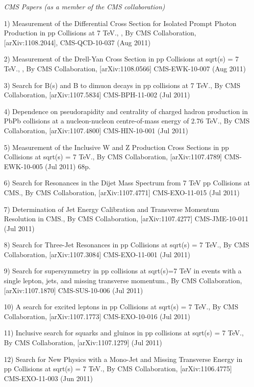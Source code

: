 \documentclass[10pt]{article}
\newenvironment{outerlist}[1][\enskip\textbullet]%
        {\begin{itemize}[#1]}{\end{itemize}%
         \vspace{-.6\baselineskip}}
\newenvironment{innerlist}[1][\enskip\textbullet]%
        {\begin{compactitem}[#1]}{\end{compactitem}}
\begin{document}
\begin{outerlist}
\item[] \textit{CMS Papers (as a member of the CMS collaboration)}
\begin{innerlist}
\item 1) Measurement of the Differential Cross Section for Isolated Prompt Photon Production in pp Collisions at 7 TeV., , By CMS Collaboration, [arXiv:1108.2044], CMS-QCD-10-037 (Aug 2011)
\item 2) Measurement of the Drell-Yan Cross Section in pp Collisions at sqrt(s) = 7 TeV., , By CMS Collaboration, [arXiv:1108.0566] CMS-EWK-10-007 (Aug 2011)
\item 3) Search for B(s) and B to dimuon decays in pp collisions at 7 TeV., By CMS Collaboration, [arXiv:1107.5834] CMS-BPH-11-002 (Jul 2011)
\item 4) Dependence on pseudorapidity and centrality of charged hadron production in PbPb collisions at a nucleon-nucleon centre-of-mass energy of 2.76 TeV., By CMS Collaboration, [arXiv:1107.4800] CMS-HIN-10-001 (Jul 2011)
\item 5) Measurement of the Inclusive W and Z Production Cross Sections in pp Collisions at sqrt(s) = 7 TeV., By CMS Collaboration, [arXiv:1107.4789] CMS-EWK-10-005 (Jul 2011) 68p.
\item 6) Search for Resonances in the Dijet Mass Spectrum from 7 TeV pp Collisions at CMS., By CMS Collaboration, [arXiv:1107.4771] CMS-EXO-11-015 (Jul 2011)
\item 7) Determination of Jet Energy Calibration and Transverse Momentum Resolution in CMS., By CMS Collaboration, [arXiv:1107.4277] CMS-JME-10-011 (Jul 2011)
\item 8) Search for Three-Jet Resonances in pp Collisions at sqrt(s) = 7 TeV., By CMS Collaboration, [arXiv:1107.3084] CMS-EXO-11-001 (Jul 2011)
\item 9) Search for supersymmetry in pp collisions at sqrt(s)=7 TeV in events with a single lepton, jets, and missing transverse momentum., By CMS Collaboration, [arXiv:1107.1870] CMS-SUS-10-006 (Jul 2011)
\item 10) A search for excited leptons in pp Collisions at sqrt(s) = 7 TeV., By CMS Collaboration, [arXiv:1107.1773] CMS-EXO-10-016 (Jul 2011)
\item 11) Inclusive search for squarks and gluinos in pp collisions at sqrt(s) = 7 TeV., By CMS Collaboration, [arXiv:1107.1279] (Jul 2011)
\item 12) Search for New Physics with a Mono-Jet and Missing Transverse Energy in pp Collisions at sqrt(s) = 7 TeV., By CMS Collaboration, [arXiv:1106.4775] CMS-EXO-11-003 (Jun 2011)

\end{innerlist}
\end{outerlist}
\end{document}
